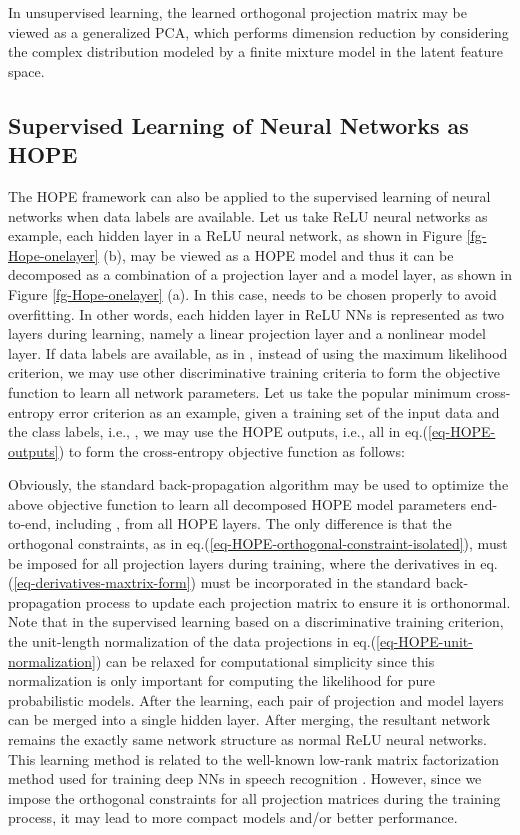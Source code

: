\documentclass[11pt]{article}
\begin{document}
In unsupervised learning, the learned orthogonal projection matrix  may be viewed as a generalized PCA, which performs dimension reduction by considering the complex distribution modeled by a finite mixture model in the latent feature space. 
 
\subsection{Supervised Learning of Neural Networks as HOPE}
\label{subsec-supervisedlearning-NN-HOPE}

The HOPE framework can also be applied to the supervised learning of neural networks when data labels are available. 
Let us take ReLU neural networks as example, each hidden layer in a ReLU neural network, as shown in Figure \ref{fg-Hope-onelayer} (b), may be viewed as a HOPE model and thus it can be decomposed as a combination of a projection layer and a model layer, as shown in Figure \ref{fg-Hope-onelayer} (a). In this case,  needs to be chosen properly to avoid overfitting. In other words, each hidden layer in ReLU NNs is represented as two layers during learning, namely a linear projection layer and a nonlinear model layer. 
If data labels are available, as in \cite{Jiang2010b,Jiang2014}, instead of using the maximum likelihood criterion, we may use other discriminative training criteria \cite{Jiang2010a} to form the objective function to learn all network parameters. Let us take the popular minimum cross-entropy error criterion as an example, given a training set of the input data and the class labels, i.e., 
, we may use the HOPE outputs, i.e., all  in eq.(\ref{eq-HOPE-outputs}) to form the cross-entropy objective function as follows:


Obviously, the standard back-propagation algorithm may be used to optimize the above objective function to learn all decomposed HOPE model parameters end-to-end, including ,  from all HOPE layers. 
The only difference is that the orthogonal constraints, as in eq.(\ref{eq-HOPE-orthogonal-constraint-isolated}), must be imposed for all projection layers during training, where the derivatives in eq.(\ref{eq-derivatives-maxtrix-form}) must be incorporated in the standard back-propagation process to update each projection matrix  to ensure it is orthonormal. Note that in the supervised learning based on a discriminative training criterion, the unit-length normalization of the data projections in eq.(\ref{eq-HOPE-unit-normalization}) can be relaxed for computational simplicity since this normalization is only important for computing the likelihood for pure probabilistic models. After the learning, each pair of projection and model layers can be merged into a single hidden layer. After merging, the resultant network remains the exactly same network structure as normal ReLU neural networks.  This learning method is related to the well-known low-rank matrix factorization method used  for training deep NNs in speech recognition \cite{SainathLowRank13,JianXueMSR13}. However, since we impose the orthogonal constraints for all projection matrices during the training process, it may lead to more compact models and/or better performance. 
\end{document}
